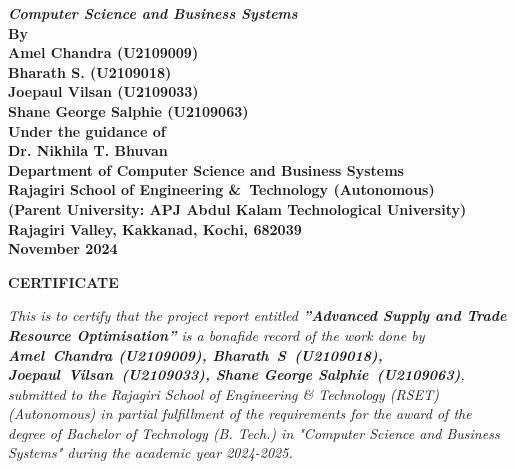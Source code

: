 \begin{center}
	{\Large \bf \itshape{{Computer Science and Business Systems}}}\\[1cm]
	\large \bfseries{By}\\[.2cm]
	\large \bfseries{Amel Chandra (U2109009)}\\[0.3cm]
	\large \bfseries{Bharath S. (U2109018)}\\[0.3cm]
	\large \bfseries{Joepaul Vilsan (U2109033)}\\[0.3cm]
	\large \bfseries{Shane George Salphie (U2109063)}\\[0.3cm]
	\large \bfseries{Under the guidance of}\\[0.5cm]
	\large \bfseries{Dr. Nikhila T. Bhuvan}\\[0.3cm]
	\large \textbf{Department of Computer Science and Business Systems}\\
	\large \textbf{Rajagiri School of Engineering \&\ Technology (Autonomous)}\\
	\small \bfseries{(Parent University: APJ Abdul Kalam Technological University)}\\
	\large \textbf{Rajagiri Valley, Kakkanad, Kochi, 682039}\\
	\large \bfseries{November 2024}
\end{center}

\newpage
\thispagestyle{empty}
\vspace{1cm}
\begin{center}

	\large \bfseries{\huge{CERTIFICATE}}\\[1cm]
\end{center}

\renewcommand{\baselinestretch}{1.2}\normalsize

\sloppy
\emph{This is to certify that the project report entitled \textbf{”Advanced Supply and Trade Resource Optimisation”} is a bonafide record of the work done by \textbf{\mbox{Amel Chandra} (U2109009), \mbox{Bharath S (U2109018)}, \mbox{Joepaul Vilsan (U2109033)}, \mbox{Shane} \mbox{George} \mbox{Salphie (U2109063)}}, submitted to the Rajagiri School of Engineering \& Technology (RSET) (Autonomous) in partial fulfillment of the requirements for the award of the degree of Bachelor of Technology (B. Tech.) in "Computer Science and Business Systems" during the academic year 2024-2025.}\\[2.5cm]

